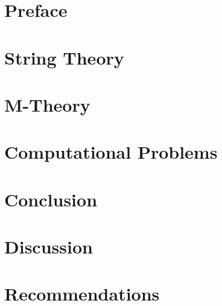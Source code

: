 \documentclass[a4paper]{report}
\begin{document}

\cleardoublepage

\chapter*{Preface}

\cleardoublepage

\renewcommand*\contentsname{Table of Contents}
\tableofcontents 
\cleardoublepage

\chapter{String Theory}

\cleardoublepage

\chapter{M-Theory}

\cleardoublepage

\chapter{Computational Problems}

\cleardoublepage

\chapter{Conclusion}

\cleardoublepage

\chapter{Discussion}

\cleardoublepage

\chapter{Recommendations}

\cleardoublepage




\setcounter{page}{1}
\cleardoublepage
\end{document}
